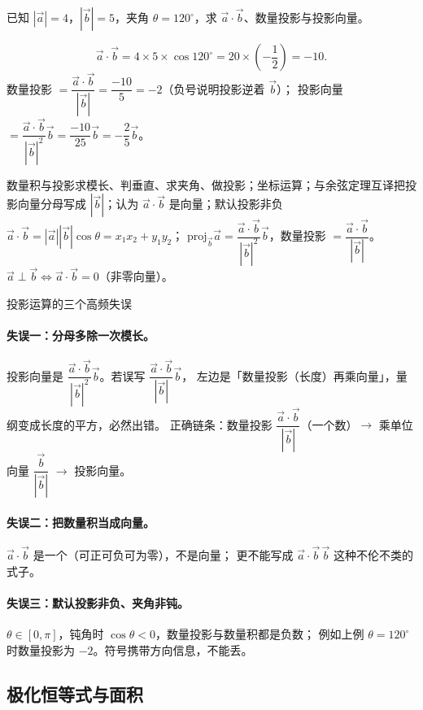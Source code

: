 \begin{explore}
\begin{example}
已知 $|\vec a|=4$，$|\vec b|=5$，夹角 $\theta=120^\circ$，求 $\vec a\cdot\vec b$、数量投影与投影向量。
\end{example}
\begin{solution}
\[
  \vec a\cdot\vec b=4\times5\times\cos120^\circ=20\times\left(-\frac12\right)=-10.
\]
数量投影 $=\dfrac{\vec a\cdot\vec b}{|\vec b|}=\dfrac{-10}{5}=-2$（负号说明投影逆着 $\vec b$）；
投影向量 $=\dfrac{\vec a\cdot\vec b}{|\vec b|^2}\vec b=\dfrac{-10}{25}\vec b=-\dfrac25\vec b$。
\end{solution}

\begin{conccard}[一级]{数量积与投影}{求模长、判垂直、求夹角、做投影；坐标运算；与余弦定理互译}{把投影向量分母写成 $|\vec b|$；认为 $\vec a\cdot\vec b$ 是向量；默认投影非负}
$\vec a\cdot\vec b=|\vec a||\vec b|\cos\theta=x_1x_2+y_1y_2$；
$\mathrm{proj}_{\vec b}\vec a=\dfrac{\vec a\cdot\vec b}{|\vec b|^2}\vec b$，数量投影 $=\dfrac{\vec a\cdot\vec b}{|\vec b|}$。
$\vec a\perp\vec b\iff\vec a\cdot\vec b=0$（非零向量）。
\end{conccard}

\begin{commonerror}{投影运算的三个高频失误}
\paragraph{失误一：分母多除一次模长。}
投影向量是 $\dfrac{\vec a\cdot\vec b}{|\vec b|^2}\vec b$。若误写 $\dfrac{\vec a\cdot\vec b}{|\vec b|}\vec b$，
左边是「数量投影（长度）再乘向量」，量纲变成长度的平方，必然出错。
正确链条：数量投影 $\dfrac{\vec a\cdot\vec b}{|\vec b|}$（一个数）$\to$ 乘单位向量 $\dfrac{\vec b}{|\vec b|}$ $\to$ 投影向量。
\paragraph{失误二：把数量积当成向量。}
$\vec a\cdot\vec b$ 是一个（可正可负可为零），不是向量；
更不能写成 $\vec a\cdot\vec b\,\vec b$ 这种不伦不类的式子。
\paragraph{失误三：默认投影非负、夹角非钝。}
$\theta\in[0,\pi]$，钝角时 $\cos\theta<0$，数量投影与数量积都是负数；
例如上例 $\theta=120^\circ$ 时数量投影为 $-2$。符号携带方向信息，不能丢。
\end{commonerror}

\subsection{极化恒等式与面积}


\end{explore}
